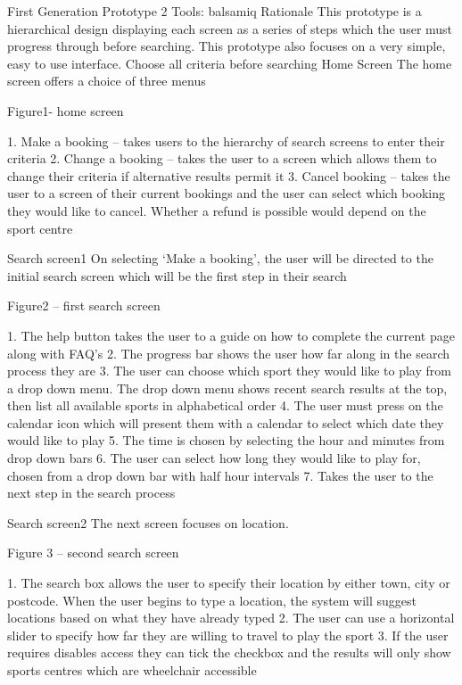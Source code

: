 First Generation Prototype 2
Tools: balsamiq
Rationale
This prototype is a hierarchical design displaying each screen as a series of steps which the user must progress through before searching. This prototype also focuses on a very simple, easy to use interface.
Choose all criteria before searching
Home Screen
The home screen offers a choice of three menus

Figure1- home screen

1.       Make a booking – takes users to the hierarchy of search screens to enter their criteria
2.       Change a booking – takes the user to a screen which allows them to change their criteria if alternative results permit it
3.       Cancel booking – takes the user to a screen of their current bookings and the user can select which booking they would like to cancel. Whether a refund is possible would depend on the sport centre

Search screen1
On selecting ‘Make a booking’, the user will be directed to the initial search screen which will be the first step in their search

Figure2 – first search screen

1.       The help button takes the user to a guide on how to complete the current page along with FAQ’s
2.       The progress bar shows the user how far along in the search process they are
3.       The user can choose which sport they would like to play from a drop down menu. The drop down menu shows recent search results at the top, then list all available sports in alphabetical order
4.       The user must press on the calendar icon which will present them with a calendar to select which date they would like to play
5.       The time is chosen by selecting the hour and minutes from drop down bars
6.       The user can select how long they would like to play for, chosen from a drop down bar with half hour intervals
7.       Takes the user to the next step in the search process

Search screen2
The next screen focuses on location.

Figure 3 – second search screen

1.       The search box allows the user to specify their location by either town, city or postcode. When the user begins to type a location, the system will suggest locations based on what they have already typed
2.       The user can use a horizontal slider to specify how far they are willing to travel to play the sport
3.       If the user requires disables access they can tick the checkbox and the results will only show sports centres which are wheelchair accessible

